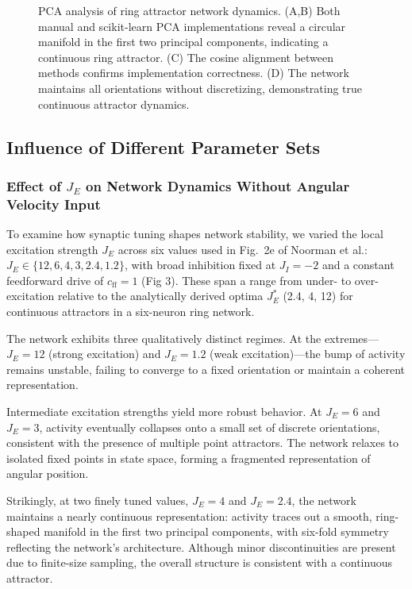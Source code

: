 \documentclass[11pt,a4paper]{article}
\begin{document}
\begin{figure}[H]
\caption{PCA analysis of ring attractor network dynamics. (A,B) Both manual and scikit-learn PCA implementations reveal a circular manifold in the first two principal components, indicating a continuous ring attractor. (C) The cosine alignment between methods confirms implementation correctness. (D) The network maintains all orientations without discretizing, demonstrating true continuous attractor dynamics.}
\label{fig:pca_analysis}
\end{figure}


\subsection{Influence of Different Parameter Sets}

\subsubsection*{Effect of \( J_E \) on Network Dynamics Without Angular Velocity Input}

To examine how synaptic tuning shapes network stability, we varied the local excitation strength \( J_E \) across six values used in Fig.~2e of Noorman et al.: \( J_E \in \{12, 6, 4, 3, 2.4, 1.2\} \), with broad inhibition fixed at \( J_I = -2 \) and a constant feedforward drive of \( c_{\text{ff}} = 1 \) (Fig 3). 
These span a range from under- to over-excitation relative to the analytically derived optima \( J_E^\ast \) (2.4, 4, 12) for continuous attractors in a six-neuron ring network.

The network exhibits three qualitatively distinct regimes. At the extremes—\( J_E = 12 \) (strong excitation) and \( J_E = 1.2 \) (weak excitation)—the bump of activity remains unstable, failing to converge to a fixed orientation or maintain a coherent representation. 

Intermediate excitation strengths yield more robust behavior. At \( J_E = 6 \) and \( J_E = 3 \), activity eventually collapses onto a small set of discrete orientations, consistent with the presence of multiple point attractors. The network relaxes to isolated fixed points in state space, forming a fragmented representation of angular position.

Strikingly, at two finely tuned values, \( J_E = 4 \) and \( J_E = 2.4 \), the network maintains a nearly continuous representation: activity traces out a smooth, ring-shaped manifold in the first two principal components, with six-fold symmetry reflecting the network’s architecture. Although minor discontinuities are present due to finite-size sampling, the overall structure is consistent with a continuous attractor.
\end{document}
